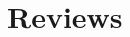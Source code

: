\documentclass[8pt]{book}
\makeatletter
\let\mcnewpage=\newpage
\newcommand{\TrickSupertabularIntoMulticols}{
  \renewcommand\newpage{
    \if@firstcolumn
      \hrule width\linewidth height0pt
      \columnbreak
    \else
      \mcnewpage
    \fi
  }
}
\makeatother
\begin{document}
\begin{multicols*}{3}
\TrickSupertabularIntoMulticols
\noindent

\end{multicols*}


\chapter{Reviews}

\begin{multicols*}{2}
\TrickSupertabularIntoMulticols
\noindent

\end{multicols*}
\end{document}
